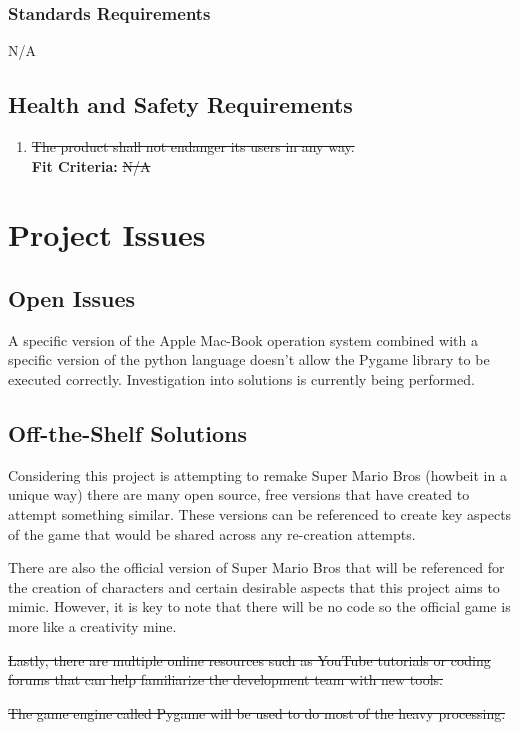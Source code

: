 \documentclass[12pt, titlepage]{article}
\begin{document}
\subsubsection{Standards Requirements}
N/A



\subsection{Health and Safety Requirements}
\begin{enumerate}[{HS}1. ]
    \item \sout{The product shall not endanger its users in any way.}\\
    \textbf{Fit Criteria:} \sout{N/A}
\end{enumerate}

\section{Project Issues}

\subsection{Open Issues}
A specific version of the Apple Mac-Book operation system combined with a specific version of the python language doesn't allow the Pygame library to be executed correctly. Investigation into solutions is currently being performed.

\subsection{Off-the-Shelf Solutions}
Considering this project is attempting to remake Super Mario Bros (howbeit in a unique way) there are many open source, free versions that have created to attempt something similar. These versions can be referenced to create key aspects of the game that would be shared across any re-creation attempts.

There are also the official version of Super Mario Bros that will be referenced for the creation of characters and certain desirable aspects that this project aims to mimic. However, it is key to note that there will be no code so the official game is more like a creativity mine.

\sout{Lastly, there are multiple online resources such as YouTube tutorials or coding forums that can help familiarize the development team with new tools.}

\sout{The game engine called Pygame will be used to do most of the heavy processing.}
\end{document}
